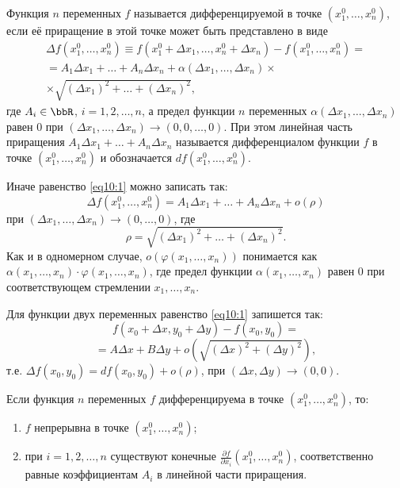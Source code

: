 \begin{defn} \label{df10:2}
Функция $n$ переменных $f$ называется дифференцируемой в точке $(x_1^0, \ldots, x_n^0)$, если её приращение в этой точке может быть представлено в виде
\begin{multline} \label{eq10:1}
\Delta f(x_1^0, \ldots, x_n^0) \equiv f(x_1^0 + \Delta x_1, \ldots, x_n^0 + \Delta x_n) - f(x_1^0, \ldots, x_n^0) = \\
= A_1\Delta x_1 + \ldots + A_n\Delta x_n + \alpha(\Delta x_1, \ldots, \Delta x_n) \times \\
\times \sqrt{(\Delta x_1)^2 + \ldots + (\Delta x_n)^2},
\end{multline}
где $A_i \in \bbR$, $i = 1, 2, \ldots, n$, а предел функции $n$ переменных $\alpha(\Delta x_1, \ldots, \Delta x_n)$ равен $0$ при $(\Delta x_1, \ldots, \Delta x_n) \to (0, 0, \ldots, 0)$. При этом линейная часть приращения $A_1\Delta x_1 + \ldots + A_n\Delta x_n$ называется дифференциалом функции $f$ в точке $(x_1^0, \ldots, x_n^0)$ и обозначается $df(x_1^0, \ldots, x_n^0)$.

Иначе равенство \eqref{eq10:1} можно записать так:
$$
\Delta f(x_1^0, \ldots, x_n^0) = A_1\Delta x_1 + \ldots + A_n\Delta x_n + o(\rho)
$$
при $(\Delta x_1, \ldots, \Delta x_n) \to (0, \ldots, 0)$, где
$$
\rho = \sqrt{(\Delta x_1)^2 + \ldots + (\Delta x_n)^2}.
$$
Как и в одномерном случае, $o(\varphi(x_1, \ldots, x_n))$ понимается как $\alpha(x_1, \ldots, x_n) \cdot \varphi(x_1, \ldots, x_n)$, где предел функции $\alpha(x_1, \ldots, x_n)$ равен $0$ при соответствующем стремлении $x_1, \ldots, x_n$.

Для функции двух переменных равенство \eqref{eq10:1} запишется так:
$$
f(x_0 + \Delta x, y_0 + \Delta y) - f(x_0, y_0) =
$$
$$
= A\Delta x + B\Delta y + o\left(\sqrt{(\Delta x)^2 + (\Delta y)^2}\right),
$$
т.е. $\Delta f(x_0, y_0) = df(x_0, y_0) + o(\rho)$, при $(\Delta x, \Delta y) \to (0, 0)$.
\end{defn}


\begin{thm} \label{th10:1}
Если функция $n$ переменных $f$ дифференцируема в точке $(x_1^0, \ldots, x_n^0)$, то:
\begin{enumerate}
    \item[1)] $f$ непрерывна в точке $(x_1^0, \ldots, x_n^0)$;
    \item[2)] при $i = 1, 2, \ldots, n$ существуют конечные $\frac{\partial f}{\partial x_i}(x_1^0, \ldots, x_n^0)$, соответственно равные коэффициентам $A_i$ в линейной части приращения.
\end{enumerate}
\end{thm}

